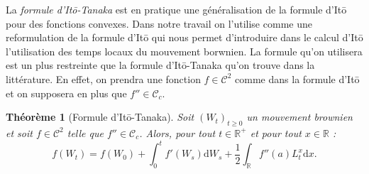 \documentclass[openany]{book}
\newcommand{\R}{\mathbb{R}}
\newcommand{\1}{\mathbbm{1}}
\renewcommand{\d}{\mathrm{d}}
\theoremstyle{thmfont}
\newtheorem{theorem}{Théorème}[chapter]
\theoremstyle{deffont}
\theoremstyle{thmfont}
\theoremstyle{deffont}
\begin{document}
La \textit{formule d'Itō-Tanaka} est en pratique une généralisation de la formule d'Itō pour des fonctions convexes. Dans notre travail on l'utilise comme une reformulation de la formule d'Itō qui nous permet d'introduire dans le calcul d'Itō l'utilisation des temps locaux du mouvement borwnien. La formule qu'on utilisera est un plus restreinte que la formule d'Itō-Tanaka qu'on trouve dans la littérature. En effet, on prendra une fonction $f \in \mathcal C^2$ comme dans la formule d'Itō et on supposera en plus que $f'' \in \mathcal C_c$.

\begin{theorem}[Formule d'Itō-Tanaka]
  Soit $(W_t)_{t\geq0}$ un mouvement brownien et soit $f \in \mathcal C^2$ telle que $f'' \in \mathcal C_c$. Alors, pour tout $t \in \R^+$ et pour tout $x \in \R$ :
  \begin{equation}
    f(W_t) = f(W_0) + \int_0^tf'(W_s) \d W_s + \dfrac{1}{2} \int_\R f''(a) L_t^x \d x.
    \label{eq:ItoTanaka}
  \end{equation}
\end{theorem}
\end{document}

